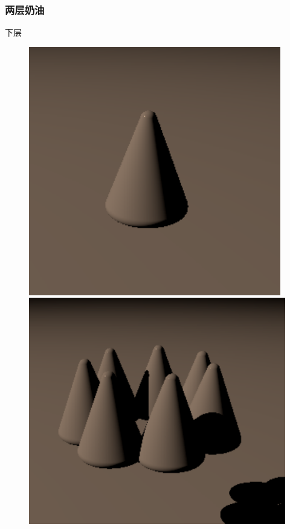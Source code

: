 \documentclass[aspectratio=169]{ctexbeamer} %
\begin{document}
\begin{frame}
    \frametitle{两层奶油}
    \begin{block}{下层}
        \begin{figure}[htbp]
            \centering
            \includegraphics[height=.3\textheight]{images/pre/head/cream1-1.pdf}
            \includegraphics[height=.3\textheight]{images/pre/head/cream1-2.pdf}

\end{figure}
\end{block}
\end{frame}
\end{document}

